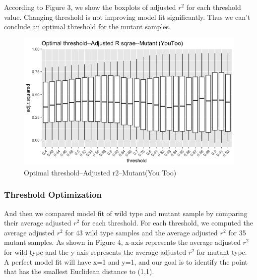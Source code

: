 \documentclass[10pt,letterpaper]{article}
\begin{document}
According to Figure 3, we show the boxplots of adjusted \(r^2\) for each
threshold value. Changing threshold is not improving model fit
significantly. Thus we can't conclude an optimal threshold for the
mutant samples.

\begin{figure}
\includegraphics[width=0.9\linewidth]{visualization_paper/threshold_boxplot_yt} \caption{Optimal threshold--Adjusted r2--Mutant(You Too)}\label{fig:Figure3}
\end{figure}

\hypertarget{threshold-optimization}{%
\subsubsection{Threshold Optimization}\label{threshold-optimization}}

And then we compared model fit of wild type and mutant sample by
comparing their average adjusted \(r^2\) for each threshold. For each
threshold, we computed the average adjusted \(r^2\) for 43 wild type
samples and the average adjusted \(r^2\) for 35 mutant samples. As shown
in Figure 4, x-axis represents the average adjusted \(r^2\) for wild
type and the y-axis represents the average adjusted \(r^2\) for mutant
type. A perfect model fit will have x=1 and y=1, and our goal is to
identify the point that has the smallest Euclidean distance to (1,1).
\end{document}
